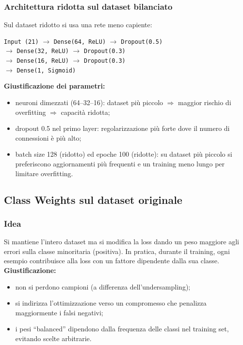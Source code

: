 \subsubsection{Architettura ridotta sul dataset bilanciato}
Sul dataset ridotto si usa una rete meno capiente:
\begin{center}
\texttt{Input (21)} $\rightarrow$ \texttt{Dense(64, ReLU)} $\rightarrow$ \texttt{Dropout(0.5)} \\
$\rightarrow$ \texttt{Dense(32, ReLU)} $\rightarrow$ \texttt{Dropout(0.3)} \\
$\rightarrow$ \texttt{Dense(16, ReLU)} $\rightarrow$ \texttt{Dropout(0.3)} \\
$\rightarrow$ \texttt{Dense(1, Sigmoid)}
\end{center}
\textbf{Giustificazione dei parametri:}
\begin{itemize}
  \item neuroni dimezzati (64--32--16): dataset più piccolo $\Rightarrow$ maggior rischio di overfitting $\Rightarrow$ capacità ridotta;
  \item dropout 0.5 nel primo layer: regolarizzazione più forte dove il numero di connessioni è più alto;
  \item batch size 128 (ridotto) ed epoche 100 (ridotte): su dataset più piccolo si preferiscono aggiornamenti più frequenti e un training meno lungo per limitare overfitting.
\end{itemize}

\subsection{Class Weights sul dataset originale}
\subsubsection{Idea}
Si mantiene l'intero dataset ma si modifica la loss dando un peso maggiore agli errori sulla classe minoritaria (positiva).
In pratica, durante il training, ogni esempio contribuisce alla loss con un fattore dipendente dalla sua classe.
\textbf{Giustificazione:}
\begin{itemize}
  \item non si perdono campioni (a differenza dell'undersampling);
  \item si indirizza l'ottimizzazione verso un compromesso che penalizza maggiormente i falsi negativi;
  \item i pesi ``balanced'' dipendono dalla frequenza delle classi nel training set, evitando scelte arbitrarie.
\end{itemize}

